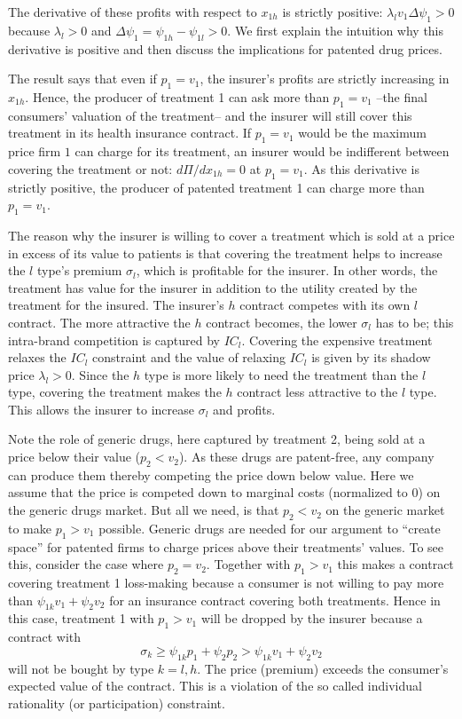 \documentclass[a4paper,12pt]{article}
\begin{document}
The derivative of these profits with respect to \(x_{1h}\) is strictly positive: \(\lambda_l v_1 \Delta \psi_1 >0\) because \(\lambda_l > 0\) and \(\Delta \psi_1 = \psi_{1h} - \psi_{1l} > 0\). We first explain the intuition why this derivative is positive and then discuss the implications for patented drug prices.

The result says that even if \(p_1=v_1\), the insurer's profits are strictly increasing in \(x_{1h}\). Hence, the producer of treatment 1 can ask more than \(p_1 = v_1\) --the final consumers' valuation of the treatment-- and the insurer will still cover this treatment in its health insurance contract. If \(p_1 = v_1\) would be the maximum price firm \(1\) can charge for its treatment, an insurer would be indifferent between covering the treatment or not: \(d\Pi/dx_{1h} = 0\) at \(p_1 = v_1\). As this derivative is strictly positive, the producer of patented treatment 1 can charge more than \(p_1=v_1\).

The reason why the insurer is willing to cover a treatment which is sold at a price in excess of its value to patients is that covering the treatment helps to increase the \(l\) type's premium \(\sigma_{l}\), which is profitable for the insurer. In other words, the treatment has value for the insurer in addition to the utility created by the treatment for the insured. The insurer's \(h\) contract competes with its own \(l\) contract. The more attractive the \(h\) contract becomes, the lower \(\sigma_{l}\) has to be; this intra-brand competition is captured by \(IC_{l}\). Covering the expensive treatment relaxes the \(IC_l\) constraint and the value of relaxing \(IC_l\) is given by its shadow price \(\lambda_l > 0\). Since the \(h\) type is more likely to need the treatment than the \(l\) type, covering the treatment makes the \(h\) contract less attractive to the \(l\) type. This allows the insurer to increase \(\sigma_l\) and profits.

Note the role of generic drugs, here captured by treatment 2, being sold at a price below their value (\(p_2 < v_2\)). As these drugs are patent-free, any company can produce them thereby competing the price down below value. Here we assume that the price is competed down to marginal costs (normalized to 0) on the generic drugs market. But all we need, is that \(p_2 < v_2\) on the generic market to make \(p_1>v_1\) possible. Generic drugs are needed for our argument to ``create space'' for patented firms to charge prices above their treatments' values. To see this, consider the case where \(p_2=v_2\). Together with \(p_1>v_1\) this makes a contract covering treatment 1 loss-making because a consumer is not willing to pay more than \(\psi_{1k} v_1 + \psi_{2} v_2\) for an insurance contract covering both treatments. Hence in this case, treatment 1 with \(p_1>v_1\) will be dropped by the insurer because a contract with
\begin{equation}
\label{eq:3}
\sigma_k \geq \psi_{1k} p_1 + \psi_2 p_2 > \psi_{1k} v_1 + \psi_2 v_2
\end{equation}
will not be bought by type \(k=l,h\). The price (premium) exceeds the consumer's expected value of the contract. This is a violation of the so called individual rationality (or participation) constraint.
\end{document}
